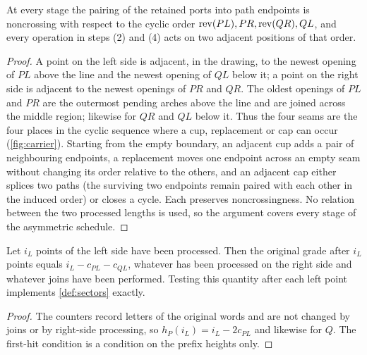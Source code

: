 \begin{lemma}
\label{lem:seams}
\leanok
{}
At every stage the pairing of the retained ports into path endpoints is
noncrossing with respect to the cyclic order $\operatorname{rev}(PL),PR,\operatorname{rev}(QR),QL$, and every
operation in steps (2) and (4) acts on two adjacent positions of that order.
\end{lemma}

\begin{proof}
\leanok
A point on the left side is adjacent, in the drawing, to the newest opening of
$PL$ above the line and the newest opening of $QL$ below it; a point on the
right side is adjacent to the newest openings of $PR$ and $QR$. The oldest
openings of $PL$ and $PR$ are the outermost pending arches above the line and
are joined across the middle region; likewise for $QR$ and $QL$ below it. Thus
the four seams are the four places in the cyclic sequence where a cup,
replacement or cap can occur (\cref{fig:carrier}). Starting from the empty
boundary, an adjacent cup adds a pair of neighbouring endpoints, a replacement
moves one endpoint across an empty seam without changing its order relative to
the others, and an adjacent cap either splices two paths (the surviving two
endpoints remain paired with each other in the induced order) or closes a
cycle. Each preserves noncrossingness. No relation between the two processed
lengths is used, so the argument covers every stage of the asymmetric schedule.
\end{proof}

\begin{lemma}
\label{lem:filter}
\leanok
{}
Let $i_L$ points of the left side have been processed. Then the original grade
after $i_L$ points equals $i_L-c_{PL}-c_{QL}$, whatever has been processed on
the right side and whatever joins have been performed. Testing this quantity
after each left point implements \cref{def:sectors} exactly.
\end{lemma}

\begin{proof}
\leanok
The counters record letters of the original words and are not changed by joins
or by right-side processing, so $h_P(i_L)=i_L-2c_{PL}$ and likewise for $Q$.
The first-hit condition is a condition on the prefix heights only.
\end{proof}

